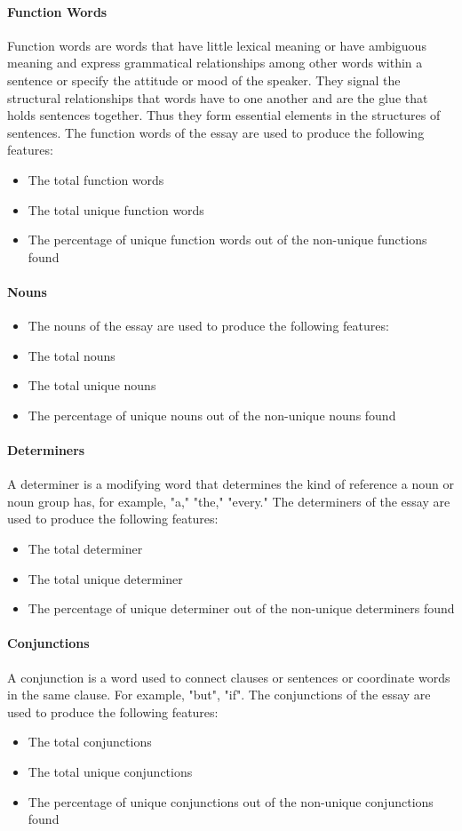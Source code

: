\paragraph{Function Words}
Function words are words that have little lexical meaning or have ambiguous meaning and express grammatical relationships among other words within a sentence or specify the attitude or mood of the speaker. They signal the structural relationships that words have to one another and are the glue that holds sentences together. Thus they form essential elements in the structures of sentences. The function words of the essay are used to produce the following features:
\begin{itemize}
 \item The total function words
 \item The total unique function words
\item The percentage of unique function words out of the non-unique functions found \end{itemize}

\paragraph{Nouns}
\begin{itemize}
 \item The nouns of the essay are used to produce the following features:
 \item The total nouns 
 \item The total unique nouns
 \item The percentage of unique nouns out of the non-unique nouns found
\end{itemize}

\paragraph{Determiners}
A determiner is a modifying word that determines the kind of reference a noun or noun group has, for example, "a," "the," "every." The determiners of the essay are used to produce the following features:
\begin{itemize}
 \item The total determiner
 \item The total unique determiner
 \item The percentage of unique determiner out of the non-unique determiners found
\end{itemize}

\paragraph{Conjunctions}
A conjunction is a word used to connect clauses or sentences or coordinate words in the same clause. For example, "but", "if". The conjunctions of the essay are used to produce the following features:
\begin{itemize}
 \item The total conjunctions 
 \item The total unique conjunctions
 \item The percentage of unique conjunctions out of the non-unique conjunctions found
\end{itemize}

